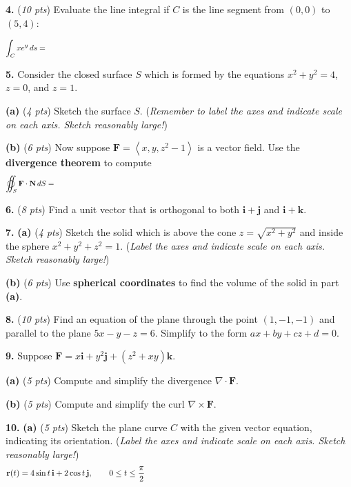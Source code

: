 \documentclass[11pt]{amsart}
\newcommand{\bi}{\mathbf{i}}
\newcommand{\bj}{\mathbf{j}}
\newcommand{\bk}{\mathbf{k}}
\newcommand{\br}{\mathbf{r}}
\newcommand{\bF}{\mathbf{F}}
\newcommand{\bN}{\mathbf{N}}
\newcommand{\Div}{\nabla\cdot}
\newcommand{\curl}{\nabla\times}
\newcommand{\prob}[1]{\bigskip\noindent\textbf{#1.} }
\newcommand{\pts}[1]{(\emph{#1 pts})}
\newcommand{\probpts}[2]{\prob{#1} \pts{#2} \quad}
\newcommand{\ppartpts}[2]{\textbf{(#1)} \pts{#2} \quad}
\newcommand{\epartpts}[2]{\medskip\noindent \textbf{(#1)} \pts{#2} \quad}
\begin{document}
\probpts{4}{10}  Evaluate the line integral if $C$ is the line segment from $(0,0)$ to $(5,4)$:

\medskip
    $$\int_C x e^y \,ds = \hspace{5.5in}$$
\vfill


\clearpage\newpage
\prob{5}  Consider the closed surface $S$ which is formed by the equations $x^2+y^2=4$, $z=0$, and $z=1$.

\epartpts{a}{4}  Sketch the surface $S$.  (\emph{Remember to label the axes and indicate scale on each axis.  Sketch reasonably large!})
\vspace{2.5in}

\epartpts{b}{6}  Now suppose $\bF=\left<x,y,z^2-1\right>$ is a vector field.  Use the \textbf{divergence theorem} to compute
    $$\varoiint_S \bF\cdot \bN\,dS = \hspace{5.5in}$$
\vfill

\probpts{6}{8}  Find a unit vector that is orthogonal to both $\bi+\bj$ and $\bi+\bk$.
\vspace{2.0in}


\clearpage\newpage
\prob{7} \ppartpts{a}{4}  Sketch the solid which is above the cone $z=\sqrt{x^2+y^2}$ and inside the sphere $x^2+y^2+z^2=1$.  (\emph{Label the axes and indicate scale on each axis.  Sketch reasonably large!})
\vspace{3.0in}

\epartpts{b}{6}  Use \textbf{spherical coordinates} to find the volume of the solid in part \textbf{(a)}.
\vfill


\clearpage\newpage
\probpts{8}{10}  Find an equation of the plane through the point $(1,-1,-1)$ and parallel to the plane $5x-y-z=6$.  Simplify to the form $ax+by+cz+d=0$.
\vfill

\prob{9}  Suppose $\bF = x \bi + y^2 \bj + (z^2+xy) \bk$.

\epartpts{a}{5}  Compute and simplify the divergence $\Div\bF$.
\vspace{2.0in}

\epartpts{b}{5}  Compute and simplify the curl $\curl\bF$.
\vspace{2.0in}


\clearpage\newpage
\prob{10} \ppartpts{a}{5}  Sketch the plane curve $C$ with the given vector equation, indicating its orientation.  (\emph{Label the axes and indicate scale on each axis.  Sketch reasonably large!})
    $$\br(t) = 4 \sin t\,\bi + 2 \cos t\,\bj, \qquad 0 \le t \le \frac{\pi}{2} \hspace{3.5in}$$
\vfill
\end{document}

